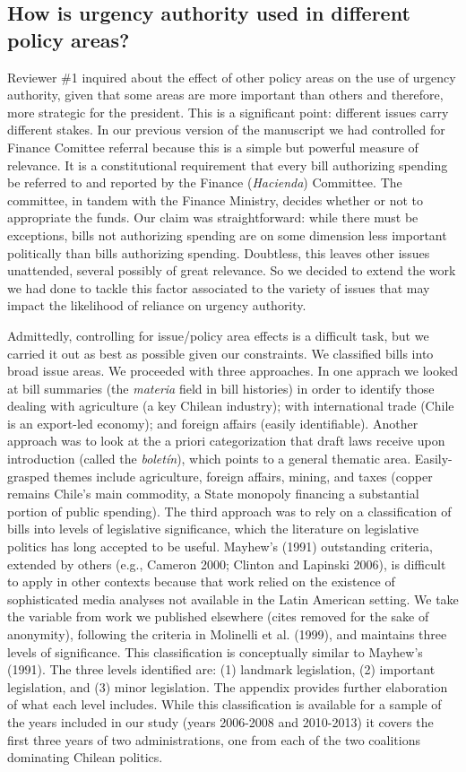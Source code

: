 \documentclass[article,letterpaper,times,12pt,listings-bw,microtype]{article}
\begin{document}
\subsection{How is urgency authority used in different policy areas?}
Reviewer \#1 inquired about the effect of other policy areas on the use of urgency authority, given that some areas are more important than others and therefore, more strategic for the president. This is a significant point: different issues carry different stakes. 
In our previous version of the manuscript we had controlled for Finance Comittee referral because this is a simple but powerful measure of relevance. It is a constitutional requirement that every bill authorizing spending be referred to and reported by the Finance (\emph{Hacienda}) Committee. The committee, in tandem with the Finance Ministry, decides whether or not to appropriate the funds. Our claim was straightforward: while there must be exceptions, bills not authorizing spending are on some dimension less important politically than bills authorizing spending. Doubtless, this leaves other issues unattended, several possibly of great relevance. So we decided to extend the work we had done to tackle this factor associated to the variety of issues that may impact the likelihood of reliance on urgency authority.

Admittedly, controlling for issue/policy area effects is a difficult task, but we carried it out as best as possible given our constraints. We classified bills into broad issue areas. We proceeded with three approaches. In one apprach we looked at bill summaries (the \emph{materia} field in bill histories) in order to identify those dealing with agriculture (a key Chilean industry); with international trade (Chile is an export-led economy); and foreign affairs (easily identifiable). Another approach was to look at the a priori categorization that draft laws receive upon introduction (called the \emph{boletín}), which points to a general thematic area. Easily-grasped themes include agriculture, foreign affairs, mining, and taxes (copper remains Chile's main commodity, a State monopoly financing a substantial portion of public spending). The third approach was to rely on a classification of bills into levels of legislative significance, which the literature on legislative politics has long accepted to be useful. Mayhew’s (1991) outstanding criteria, extended by others (e.g., Cameron 2000; Clinton and Lapinski 2006), is difficult to apply in other contexts because that work relied on the existence of sophisticated media analyses not available in the Latin American setting. We take the variable from work we published elsewhere (cites removed for the sake of anonymity), following the criteria in Molinelli et al. (1999), and maintains three levels of significance. This classification is conceptually similar to Mayhew's (1991). The three levels identified are: (1) landmark legislation, (2) important legislation, and (3) minor legislation. The appendix provides further elaboration of what each level includes. While this classification is available for a sample of the years included in our study (years 2006-2008 and 2010-2013) it covers the first three years of two administrations, one from each of the two coalitions dominating Chilean politics.
\end{document}
